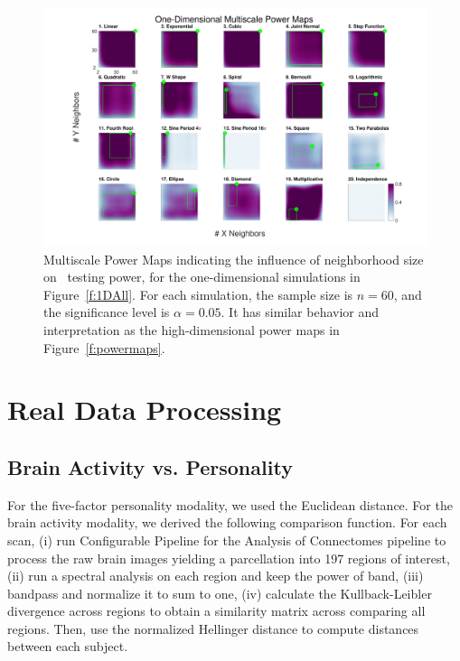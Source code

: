 \documentclass[11pt]{article}
\begin{document}
\begin{figure}[htbp]
\includegraphics[width=1.0\textwidth,trim={3cm 0.5cm 2.3cm 0.5cm},clip]{Figures/Fig1DHeat}
\caption{Multiscale Power Maps indicating the influence of neighborhood size on \Mgc~testing power, for the one-dimensional simulations in Figure~\ref{f:1DAll}. For each simulation,  the sample size is $n=60$, and the significance level is $\alpha=0.05$. It has similar behavior and interpretation as the high-dimensional power maps in Figure~\ref{f:powermaps}.}
\label{f:powermaps1}
\end{figure}

\clearpage
\section{Real Data Processing}
\label{appen:real}



\subsection{Brain Activity vs. Personality}

For the five-factor personality modality, we  used the Euclidean distance. For the brain activity modality,
we derived the following comparison function. For each scan, (i) run Configurable Pipeline for the
 Analysis of Connectomes pipeline \cite{CPAC2015} to process the raw brain images yielding a parcellation into
197 regions of interest, 
(ii) run a spectral analysis on each region and keep the power of band, 
(iii) bandpass and normalize it to sum to one, 
(iv) calculate the Kullback-Leibler divergence across regions to obtain a similarity matrix across comparing all regions. 
Then, use the normalized Hellinger distance to compute distances between each subject.
\end{document}
